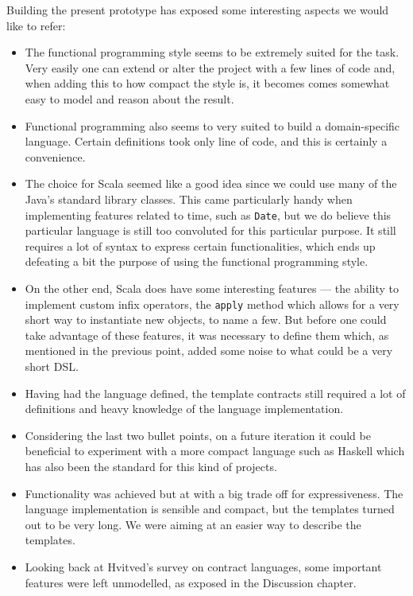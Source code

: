 \documentclass{ituthesis}
\begin{document}
Building the present prototype has exposed some interesting aspects we would like to refer:
\begin{itemize}
    \item The functional programming style seems to be extremely suited for the task. Very easily one can extend or alter the project with a few lines of code and, when adding this to how compact the style is, it becomes comes somewhat easy to model and reason about the result.
    \item Functional programming also seems to very suited to build a domain-specific language. Certain definitions took only line of code, and this is certainly a convenience.
    \item The choice for Scala seemed like a good idea since we could use many of the Java's standard library classes. This came particularly handy when implementing features related to time, such as \texttt{Date}, but we do believe this particular language is still too convoluted for this particular purpose. It still requires a lot of syntax to express certain functionalities, which ends up defeating a bit the purpose of using the functional programming style.
    \item On the other end, Scala does have some interesting features --- the ability to implement custom infix operators, the \texttt{apply} method which allows for a very short way to instantiate new objects, to name a few. But before one could take advantage of these features, it was necessary to define them which, as mentioned in the previous point, added some noise to what could be a very short DSL.
    \item Having had the language defined, the template contracts still required a lot of definitions and heavy knowledge of the language implementation.
    \item Considering the last two bullet points, on a future iteration it could be beneficial to experiment with a more compact language such as Haskell which has also been the standard for this kind of projects.
    \item Functionality was achieved but at with a big trade off for expressiveness. The language implementation is sensible and compact, but the templates turned out to be very long. We were aiming at an easier way to describe the templates.
    \item Looking back at Hvitved's survey on contract languages, some important features were left unmodelled, as exposed in the Discussion chapter.

\end{itemize}



\printbibliography
\end{document}
